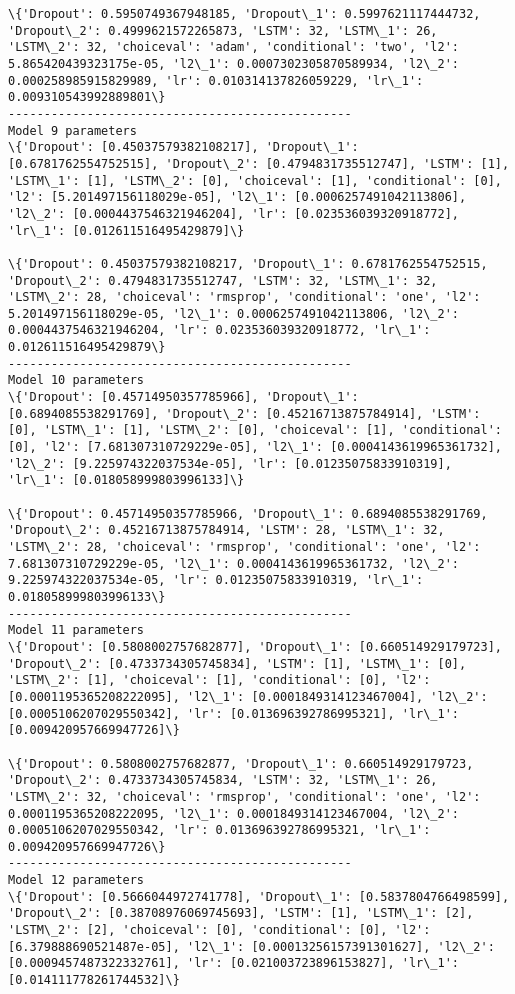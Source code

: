 \documentclass[11pt]{article}
\begin{document}
\begin{Verbatim}[commandchars=\\\{\}]
\{'Dropout': 0.5950749367948185, 'Dropout\_1': 0.5997621117444732, 'Dropout\_2': 0.4999621572265873, 'LSTM': 32, 'LSTM\_1': 26, 'LSTM\_2': 32, 'choiceval': 'adam', 'conditional': 'two', 'l2': 5.865420439323175e-05, 'l2\_1': 0.0007302305870589934, 'l2\_2': 0.000258985915829989, 'lr': 0.010314137826059229, 'lr\_1': 0.009310543992889801\}
------------------------------------------------
Model 9 parameters
\{'Dropout': [0.45037579382108217], 'Dropout\_1': [0.6781762554752515], 'Dropout\_2': [0.4794831735512747], 'LSTM': [1], 'LSTM\_1': [1], 'LSTM\_2': [0], 'choiceval': [1], 'conditional': [0], 'l2': [5.201497156118029e-05], 'l2\_1': [0.0006257491042113806], 'l2\_2': [0.0004437546321946204], 'lr': [0.023536039320918772], 'lr\_1': [0.012611516495429879]\}

\{'Dropout': 0.45037579382108217, 'Dropout\_1': 0.6781762554752515, 'Dropout\_2': 0.4794831735512747, 'LSTM': 32, 'LSTM\_1': 32, 'LSTM\_2': 28, 'choiceval': 'rmsprop', 'conditional': 'one', 'l2': 5.201497156118029e-05, 'l2\_1': 0.0006257491042113806, 'l2\_2': 0.0004437546321946204, 'lr': 0.023536039320918772, 'lr\_1': 0.012611516495429879\}
------------------------------------------------
Model 10 parameters
\{'Dropout': [0.45714950357785966], 'Dropout\_1': [0.6894085538291769], 'Dropout\_2': [0.45216713875784914], 'LSTM': [0], 'LSTM\_1': [1], 'LSTM\_2': [0], 'choiceval': [1], 'conditional': [0], 'l2': [7.681307310729229e-05], 'l2\_1': [0.0004143619965361732], 'l2\_2': [9.225974322037534e-05], 'lr': [0.01235075833910319], 'lr\_1': [0.018058999803996133]\}

\{'Dropout': 0.45714950357785966, 'Dropout\_1': 0.6894085538291769, 'Dropout\_2': 0.45216713875784914, 'LSTM': 28, 'LSTM\_1': 32, 'LSTM\_2': 28, 'choiceval': 'rmsprop', 'conditional': 'one', 'l2': 7.681307310729229e-05, 'l2\_1': 0.0004143619965361732, 'l2\_2': 9.225974322037534e-05, 'lr': 0.01235075833910319, 'lr\_1': 0.018058999803996133\}
------------------------------------------------
Model 11 parameters
\{'Dropout': [0.5808002757682877], 'Dropout\_1': [0.660514929179723], 'Dropout\_2': [0.4733734305745834], 'LSTM': [1], 'LSTM\_1': [0], 'LSTM\_2': [1], 'choiceval': [1], 'conditional': [0], 'l2': [0.0001195365208222095], 'l2\_1': [0.0001849314123467004], 'l2\_2': [0.0005106207029550342], 'lr': [0.013696392786995321], 'lr\_1': [0.009420957669947726]\}

\{'Dropout': 0.5808002757682877, 'Dropout\_1': 0.660514929179723, 'Dropout\_2': 0.4733734305745834, 'LSTM': 32, 'LSTM\_1': 26, 'LSTM\_2': 32, 'choiceval': 'rmsprop', 'conditional': 'one', 'l2': 0.0001195365208222095, 'l2\_1': 0.0001849314123467004, 'l2\_2': 0.0005106207029550342, 'lr': 0.013696392786995321, 'lr\_1': 0.009420957669947726\}
------------------------------------------------
Model 12 parameters
\{'Dropout': [0.5666044972741778], 'Dropout\_1': [0.5837804766498599], 'Dropout\_2': [0.38708976069745693], 'LSTM': [1], 'LSTM\_1': [2], 'LSTM\_2': [2], 'choiceval': [0], 'conditional': [0], 'l2': [6.379888690521487e-05], 'l2\_1': [0.00013256157391301627], 'l2\_2': [0.0009457487322332761], 'lr': [0.021003723896153827], 'lr\_1': [0.014111778261744532]\}


\end{Verbatim}
\end{document}
